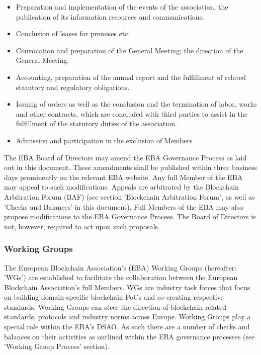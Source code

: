 \documentclass{article}
\begin{document}
\begin{itemize}
	\item {Preparation and implementation of the events of the association, the publication of its information resources and communications.}
	\item {Conclusion of leases for premises etc.}
	\item {Convocation and preparation of the General Meeting; the direction of the General Meeting.}
	\item {Accounting, preparation of the annual report and the fulfillment of related statutory and regulatory obligations.}
	\item {Issuing of orders as well as the conclusion and the termination of labor, works and other contracts, which are concluded with third parties to assist in the fulfillment of the statutory duties of the association.}
	\item {Admission and participation in the exclusion of Members}
\end{itemize}

The EBA Board of Directors may amend the EBA Governance Process as laid out in this document. 
These amendments shall be published within three business days prominently on the relevant EBA website.
Any full Member of the EBA may appeal to such modifications. 
Appeals are arbitrated by the Blockchain Arbitration Forum (BAF) (see section 'Blockchain Arbitration Forum', as well as 'Checks and Balances' in this document). 
Full Members of the EBA may also propose modifications to the EBA Governance Process. 
The Board of Directors is not, however, required to act upon such proposals.

\subsubsection{Working Groups}

The European Blockchain Association's (EBA) Working Groups (hereafter: 'WGs') are established to facilitate the collaboration between the European Blockchain Association's full Members. 
WGs are industry task forces that focus on building domain-specific blockchain PoCs and co-creating respective standards. 
Working Groups can steer the direction of blockchain related standards, protocols and industry norms across Europe. 
Working Groups play a special role within the EBA's DSAO. 
As such there are a number of checks and balances on their activities as outlined within the EBA governance processes (see 'Working Group Process' section). 
\end{document}
